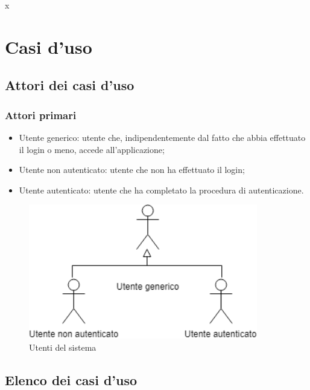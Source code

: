 x\clearpage
\section{Casi d'uso}
\label{sec:user_case}
\subsection{Attori dei casi d'uso}
\label{sec:attori_uc}
\subsubsection{Attori primari}
\begin{itemize}
	\item  Utente generico: utente che, indipendentemente dal fatto che abbia effettuato il login o meno, accede all'applicazione;
	\item  Utente non autenticato: utente che non ha effettuato il login;
	\item  Utente autenticato: utente che ha completato la procedura di autenticazione.
\end{itemize}

\begin{figure}[H]
	\centering
	\includegraphics[width=10cm,keepaspectratio]{../includes/pics/primari.png}
	\caption{\label{fig:mission}Utenti del sistema}
\end{figure}

\subsection{Elenco dei casi d'uso}
\label{sec:elenco_uc}

